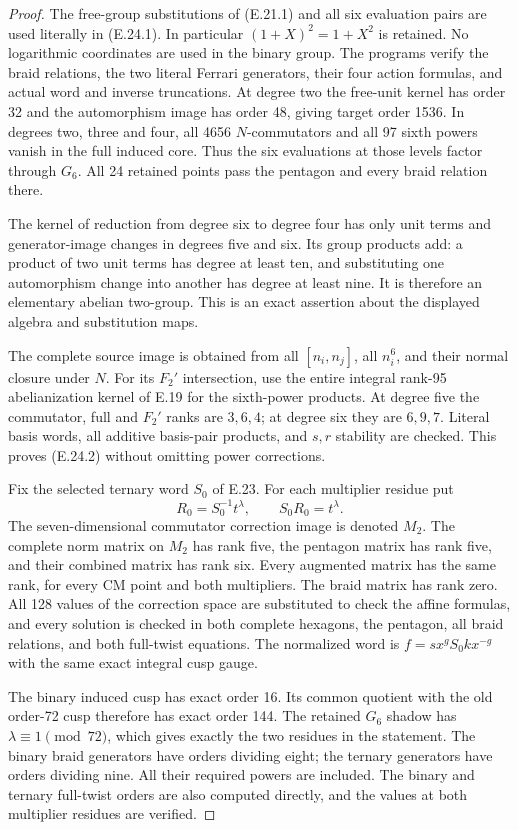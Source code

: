 \begin{proof}
The free-group substitutions of
(E.21.1) and all six evaluation
pairs are used literally in
(E.24.1). In particular
$(1+X)^2=1+X^2$ is retained.
No logarithmic coordinates are
used in the binary group.
The programs verify the braid
relations, the two literal
Ferrari generators, their four
action formulas, and actual
word and inverse truncations.
At degree two the free-unit
kernel has order 32 and the
automorphism image has order
48, giving target order 1536.
In degrees two, three and four,
all 4656 $N$-commutators and
all 97 sixth powers vanish
in the full induced core.
Thus the six evaluations at
those levels factor through
$G_6$. All 24 retained points
pass the pentagon and every
braid relation there.

The kernel of reduction from
degree six to degree four
has only unit terms and
generator-image changes in
degrees five and six. Its
group products add: a product
of two unit terms has degree
at least ten, and substituting
one automorphism change into
another has degree at least
nine. It is therefore an
elementary abelian two-group.
This is an exact assertion
about the displayed algebra
and substitution maps.

The complete source image
is obtained from all
$[n_i,n_j]$, all $n_i^6$,
and their normal closure
under $N$. For its
$F_2'$ intersection, use
the entire integral rank-95
abelianization kernel of
E.19 for the sixth-power
products. At degree five
the commutator, full and
$F_2'$ ranks are $3,6,4$;
at degree six they are
$6,9,7$. Literal basis
words, all additive
basis-pair products, and
$s,r$ stability are
checked. This proves
(E.24.2) without omitting
power corrections.

Fix the selected ternary
word $S_0$ of E.23. For
each multiplier residue
put
\[
 R_0=S_0^{-1}t^\lambda,
 \qquad S_0R_0=t^\lambda.
 \tag{E.24.6}
\]
The seven-dimensional
commutator correction
image is denoted $M_2$.
The complete norm matrix
on $M_2$ has rank five,
the pentagon matrix has
rank five, and their
combined matrix has
rank six. Every augmented
matrix has the same
rank, for every CM point
and both multipliers.
The braid matrix has
rank zero. All 128 values
of the correction space
are substituted to check
the affine formulas,
and every solution is
checked in both complete
hexagons, the pentagon,
all braid relations, and
both full-twist equations.
The normalized word is
$f=sx^gS_0k x^{-g}$
with the same exact
integral cusp gauge.

The binary induced cusp
has exact order 16.
Its common quotient
with the old order-72
cusp therefore has exact
order 144. The retained
$G_6$ shadow has
$\lambda\equiv1\pmod{72}$,
which gives exactly the
two residues in the
statement. The binary
braid generators have
orders dividing eight;
the ternary generators
have orders dividing
nine. All their required
powers are included.
The binary and ternary
full-twist orders are
also computed directly,
and the values at both
multiplier residues are
verified.


\end{proof}
